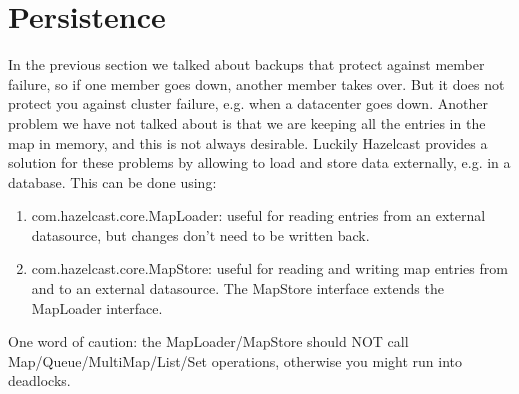 \section{Persistence}
In the previous section we talked about backups that protect against member failure, so if one member goes down, another member takes over. But it does not protect you against cluster failure, e.g. when a datacenter goes down. Another problem we have not talked about is that we are keeping all the entries in the map in memory, and this is not always desirable. Luckily Hazelcast provides a solution for these problems by allowing to load and store data externally, e.g. in a database. This can be done using:
\begin{enumerate}
\item com.hazelcast.core.MapLoader: useful for reading entries from an external datasource, but changes don't need to be written back.
\item com.hazelcast.core.MapStore: useful for reading and writing map entries from and to an external datasource. The MapStore interface extends the MapLoader interface.
\end{enumerate}
One word of caution: the MapLoader/MapStore should NOT call Map/Queue/MultiMap/List/Set operations, otherwise you might run into deadlocks.

